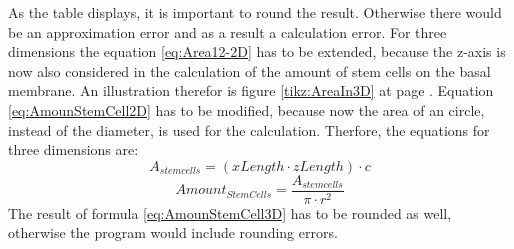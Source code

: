 As the table displays, it is important to round the result. Otherwise there would be an approximation error and as a result a calculation error. \newline
For three dimensions the equation \ref{eq:Area12-2D} has to be extended, because the z-axis is now also considered in the calculation of the amount of stem cells on the basal membrane. An illustration therefor is figure \ref{tikz:AreaIn3D} at page \pageref{tikz:AreaIn3D}. Equation \ref{eq:AmounStemCell2D} has to be modified, because now the area of an circle, instead of the diameter, is used for the calculation. Therfore, the equations for three dimensions are:
\begin{equation}\label{eq:Area12-3D}
A_{stem cells} = (xLength \cdot zLength) \cdot c
\end{equation}
\begin{equation}\label{eq:AmounStemCell3D}
Amount_{StemCells} = \dfrac{A_{stem cells}}{\pi \cdot r^{2}} 
\end{equation}
The result of formula \ref{eq:AmounStemCell3D} has to be rounded as well, otherwise the program would include rounding errors. 


%
%        
%
%


